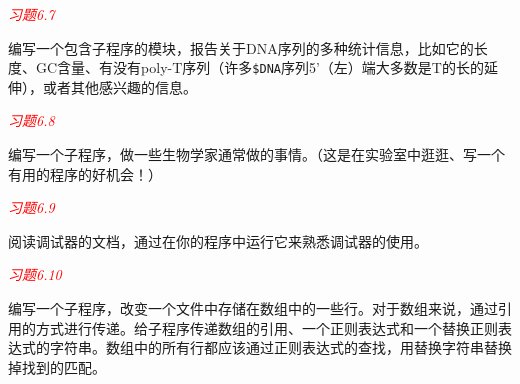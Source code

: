 \textcolor{red}{\textit{习题6.7}}
\begin{adjustwidth}{1cm}{}
编写一个包含子程序的模块，报告关于DNA序列的多种统计信息，比如它的长度、GC含量、有没有poly-T序列（许多\verb|$DNA|序列5'（左）端大多数是T的长的延伸），或者其他感兴趣的信息。
\end{adjustwidth}

\textcolor{red}{\textit{习题6.8}}
\begin{adjustwidth}{1cm}{}
编写一个子程序，做一些生物学家通常做的事情。（这是在实验室中逛逛、写一个有用的程序的好机会！）
\end{adjustwidth}

\textcolor{red}{\textit{习题6.9}}
\begin{adjustwidth}{1cm}{}
阅读调试器的文档，通过在你的程序中运行它来熟悉调试器的使用。
\end{adjustwidth}

\textcolor{red}{\textit{习题6.10}}
\begin{adjustwidth}{1cm}{}
编写一个子程序，改变一个文件中存储在数组中的一些行。对于数组来说，通过引用的方式进行传递。给子程序传递数组的引用、一个正则表达式和一个替换正则表达式的字符串。数组中的所有行都应该通过正则表达式的查找，用替换字符串替换掉找到的匹配。
\end{adjustwidth}
